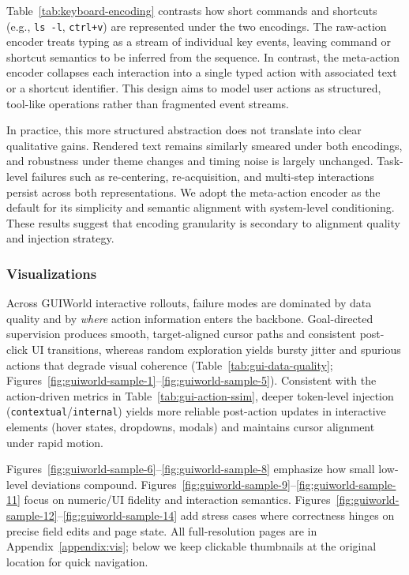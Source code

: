 Table~\ref{tab:keyboard-encoding} contrasts how short commands and shortcuts (e.g., \texttt{ls -l}, \texttt{ctrl+v}) are represented under the two encodings.
The raw-action encoder treats typing as a stream of individual key events, leaving command or shortcut semantics to be inferred from the sequence.
In contrast, the meta-action encoder collapses each interaction into a single typed action with associated text or a shortcut identifier.
This design aims to model user actions as structured, tool-like operations rather than fragmented event streams.

In practice, this more structured abstraction does not translate into clear qualitative gains.
Rendered text remains similarly smeared under both encodings, and robustness under theme changes and timing noise is largely unchanged.
Task-level failures such as re-centering, re-acquisition, and multi-step interactions persist across both representations.
We adopt the meta-action encoder as the default for its simplicity and semantic alignment with system-level conditioning.
These results suggest that encoding granularity is secondary to alignment quality and injection strategy.


\subsubsection{Visualizations}

Across GUIWorld interactive rollouts, failure modes are dominated by data quality and by \emph{where} action information enters the backbone.
Goal-directed supervision produces smooth, target-aligned cursor paths and consistent post-click UI transitions, whereas random exploration yields bursty jitter and spurious actions that degrade visual coherence (Table~\ref{tab:gui-data-quality}; Figures~\ref{fig:guiworld-sample-1}--\ref{fig:guiworld-sample-5}).
Consistent with the action-driven metrics in Table~\ref{tab:gui-action-ssim}, deeper token-level injection (\texttt{contextual}/\texttt{internal}) yields more reliable post-action updates in interactive elements (hover states, dropdowns, modals) and maintains cursor alignment under rapid motion.

Figures~\ref{fig:guiworld-sample-6}--\ref{fig:guiworld-sample-8} emphasize how small low-level deviations compound.
Figures~\ref{fig:guiworld-sample-9}--\ref{fig:guiworld-sample-11} focus on numeric/UI fidelity and interaction semantics.
Figures~\ref{fig:guiworld-sample-12}--\ref{fig:guiworld-sample-14} add stress cases where correctness hinges on precise field edits and page state.
All full-resolution pages are in Appendix~\ref{appendix:vis}; below we keep clickable thumbnails at the original location for quick navigation.

